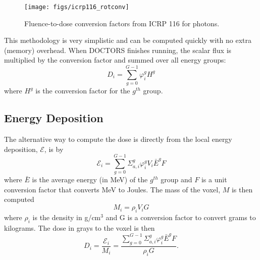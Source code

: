\begin{figure}[tb]
  \begin{center}
   \texttt{[image: figs/icrp116\_rotconv]}
  \end{center}
  \caption{Fluence-to-dose conversion factors from ICRP 116 for photons.}
\label{fig:icrp116_rotconv}
\end{figure}

This methodology is very simplistic and can be computed quickly with no extra (memory) overhead. When DOCTORS finishes running, the scalar flux is multiplied by the conversion factor and summed over all energy groups:
\begin{equation}
D_i = \sum_{g=0}^{G-1} \varphi_i^g H^g
\end{equation}
where $H^g$ is the conversion factor for the $g^{th}$ group.

\subsection{Energy Deposition}

The alternative way to compute the dose is directly from the local energy deposition, $\mathcal{E}$, is by
\begin{equation}
\mathcal{E}_i = \sum_{g=0}^{G-1} \Sigma_{a,i}^g \varphi_i^g V_i \bar{E}^g F
\end{equation}
where $\bar{E}$ is the average energy (in MeV) of the $g^{th}$ group and $F$ is a unit conversion factor that converts MeV to Joules. The mass of the voxel, $M$ is then computed
\begin{equation}
M_i = \rho_i V_i G
\end{equation}
where $\rho_i$ is the density in g/cm$^3$ and G is a conversion factor to convert grams to kilograms. The dose in grays to the voxel is then
\begin{equation}
D_i = \frac{\mathcal{E}_i}{M_i} = \frac{\sum_{g=0}^{G-1} \Sigma_{a,i}^g \varphi_i^g \bar{E}^g F}{\rho_i G}.
\end{equation}

\endinput
